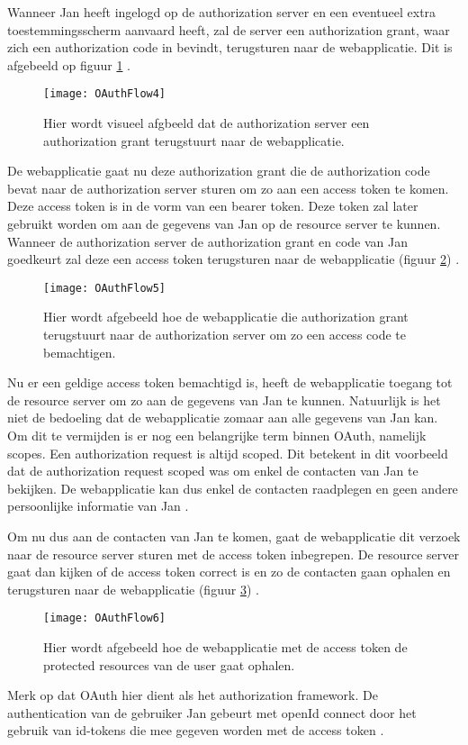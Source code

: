 Wanneer Jan heeft ingelogd op de authorization server en een eventueel extra toestemmingsscherm aanvaard heeft, zal de server een authorization grant, waar zich een authorization code in bevindt, terugsturen naar de webapplicatie. Dit is afgebeeld op figuur \ref{fig:oauth4}  \autocite{Services2016}.
\begin{figure}[H]
	\centering
	\texttt{[image: OAuthFlow4]} 
	\caption[Authorization grant wordt teruggestuurd]{Hier wordt visueel afgbeeld dat de authorization server een authorization grant terugstuurt naar de webapplicatie.}
	\label{fig:oauth4}
\end{figure}
De webapplicatie gaat nu deze authorization grant die de authorization code bevat naar de authorization server sturen om zo aan een access token te komen. Deze access token is in de vorm van een bearer token. Deze token zal later gebruikt worden om aan de gegevens van Jan op de resource server te kunnen. Wanneer de authorization server de authorization grant en code van Jan goedkeurt zal deze een access token terugsturen naar de webapplicatie (figuur \ref{fig:oauth5})  \autocite{Services2016} \autocite{OktaDev2018}.
\begin{figure}[H]
	\centering
	\texttt{[image: OAuthFlow5]} 
	\caption[Ophalen van de access code]{Hier wordt afgebeeld hoe de webapplicatie die authorization grant terugstuurt naar de authorization server om zo een access code te bemachtigen.}
	\label{fig:oauth5}
\end{figure}
Nu er een geldige access token bemachtigd is, heeft de webapplicatie toegang tot de resource server om zo aan de gegevens van Jan te kunnen. Natuurlijk is het niet de bedoeling dat de webapplicatie zomaar aan alle gegevens van Jan kan. Om dit te vermijden is er nog een belangrijke term binnen OAuth, namelijk scopes. Een authorization request is altijd scoped. Dit betekent in dit voorbeeld dat de authorization request scoped was om enkel de contacten van Jan te bekijken. De webapplicatie kan dus enkel de contacten raadplegen en geen andere persoonlijke informatie van Jan \autocite{Services2016} \autocite{OktaDev2018}. 

Om nu dus aan de contacten van Jan te komen, gaat de webapplicatie dit verzoek naar de resource server sturen met de access token inbegrepen. De resource server gaat dan kijken of de access token correct is en zo de contacten gaan ophalen en terugsturen naar de webapplicatie (figuur \ref{fig:oauth6}) \autocite{Services2016} \autocite{OktaDev2018}.

\begin{figure}[H]
	\centering
	\texttt{[image: OAuthFlow6]} 
	\caption[Gebruik van access token voor ophalen protected resource]{Hier wordt afgebeeld hoe de webapplicatie met de access token de protected resources van de user gaat ophalen.}
	\label{fig:oauth6}
\end{figure}
Merk op dat OAuth hier dient als het authorization framework. De authentication van de gebruiker Jan gebeurt met openId connect door het gebruik van id-tokens die mee gegeven worden met de access token \autocite{OktaDev2018}.

